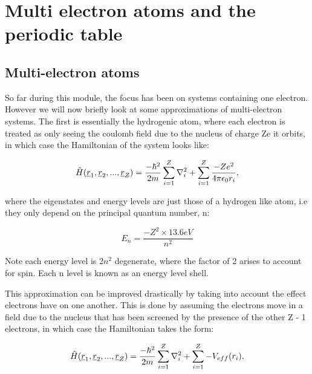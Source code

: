 \chapter{Multi electron atoms and the periodic table}
\label{chapt6}

\section{Multi-electron atoms}

So far during this module, the focus has been on systems containing one electron. However we will now briefly look at some approximations of multi-electron systems. The first is essentially the hydrogenic atom, where each electron is treated as only seeing the coulomb field due to the nucleus of charge Ze it orbits, in which case the Hamiltonian of the system looks like:

\begin{equation}
    \Hat{H}(\underline{r}_1, \underline{r}_2, ..., \underline{r}_Z) = \frac{-\hbar^2}{2m} \sum^Z_{i=1} \nabla^2_i + \sum^Z_{i=1} \frac{-Ze^2}{4 \pi \epsilon_0 r_i},
    \label{HydrogenAtomApproximationHamiltonian}
\end{equation}

\noindent where the eigenstates and energy levels are just those of a hydrogen like atom, i.e they only depend on the principal quantum number, n:

\begin{equation}
    E_n = \frac{-Z^2 \times 13.6eV}{n^2}
    \label{HydrogenicAtomEnergyLevels}
\end{equation}

\noindent Note each energy level is 2$n^2$ degenerate, where the factor of 2 arises to account for spin. Each n level is known as an energy level shell.

\noindent This approximation can be improved drastically by taking into account the effect electrons have on one another. This is done by assuming the electrons move in a field due to the nucleus that has been screened by the presence of the other Z - 1 electrons, in which case the Hamiltonian takes the form:

\begin{equation}
    \Hat{H}(\underline{r}_1, \underline{r}_2, ..., \underline{r}_Z) = \frac{-\hbar^2}{2m} \sum^Z_{i=1} \nabla^2_i + \sum^Z_{i=1} -V_{eff}(r_i),
    \label{ScreenedPotentialApproximationHamiltonian}
\end{equation}

